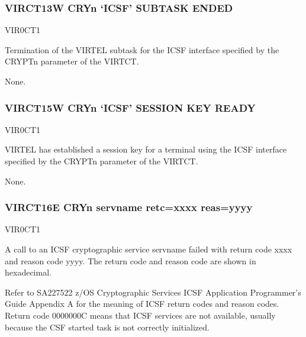 \documentclass[letterpaper,10pt,english]{sphinxmanual}
\begin{document}
\subsubsection{VIRCT13W CRYn ‘ICSF’ SUBTASK ENDED}
\label{\detokenize{messages:virct13w-cryn-icsf-subtask-ended}}\begin{description}
\sphinxAtStartPar
VIR0CT1

\sphinxAtStartPar
Termination of the VIRTEL subtask for the ICSF interface specified by the CRYPTn parameter of the VIRTCT.

\sphinxAtStartPar
None.

\end{description}


\subsubsection{VIRCT15W CRYn ‘ICSF’ SESSION KEY READY}
\label{\detokenize{messages:virct15w-cryn-icsf-session-key-ready}}\begin{description}
\sphinxAtStartPar
VIR0CT1

\sphinxAtStartPar
VIRTEL has established a session key for a terminal using the ICSF interface specified by the CRYPTn parameter of the VIRTCT.

\sphinxAtStartPar
None.

\end{description}


\subsubsection{VIRCT16E CRYn  servname retc=xxxx reas=yyyy}
\label{\detokenize{messages:virct16e-cryn-error-servname-retc-xxxx-reas-yyyy}}\begin{description}
\sphinxAtStartPar
VIR0CT1

\sphinxAtStartPar
A call to an ICSF cryptographic service servname failed with return code xxxx and reason code yyyy. The return code and reason code are shown in hexadecimal.

\sphinxAtStartPar
Refer to SA22\sphinxhyphen{}7522 z/OS Cryptographic Services ICSF Application Programmer’s Guide Appendix A for the meaning of ICSF return codes and reason codes. Return code 0000000C means that ICSF services are not available, usually because the CSF started task is not correctly initialized.

\end{description}
\end{document}
